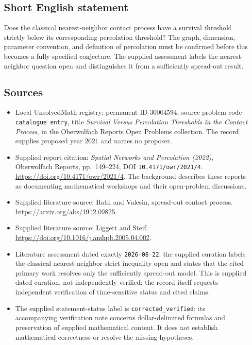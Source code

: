 \documentclass[11pt]{article}
\begin{document}
\subsection{Short English statement}
Does the classical nearest-neighbor contact process have a survival threshold strictly below its corresponding percolation threshold? The graph, dimension, parameter convention, and definition of percolation must be confirmed before this becomes a fully specified conjecture. The supplied assessment labels the nearest-neighbor question open and distinguishes it from a sufficiently spread-out result.
\subsection{Sources}
\begin{itemize}
\item Local UnsolvedMath registry: permanent ID \(30004594\), source problem code \texttt{catalogue entry}, title \emph{Survival Versus Percolation Thresholds in the Contact Process}, in the Oberwolfach Reports Open Problems collection. The record supplies proposed year \(2021\) and names no proposer.
\item Supplied report citation: \emph{Spatial Networks and Percolation (2022)}, Oberwolfach Reports, pp.\ 149--224, DOI \texttt{10.4171/owr/2021/4}. \url{https://doi.org/10.4171/owr/2021/4}. The background describes these reports as documenting mathematical workshops and their open-problem discussions.
\item Supplied literature source: Rath and Valesin, spread-out contact process. \url{https://arxiv.org/abs/1912.09825}.
\item Supplied literature source: Liggett and Steif. \url{https://doi.org/10.1016/j.anihpb.2005.04.002}.
\item Literature assessment dated exactly \texttt{2026-08-22}: the supplied curation labels the classical nearest-neighbor strict inequality open and states that the cited primary work resolves only the sufficiently spread-out model. This is supplied dated curation, not independently verified; the record itself requests independent verification of time-sensitive status and cited claims.
\item The supplied statement-status label is \texttt{corrected\_verified}; its accompanying verification note concerns dollar-delimited formulas and preservation of supplied mathematical content. It does not establish mathematical correctness or resolve the missing hypotheses.
\end{itemize}
\end{document}
